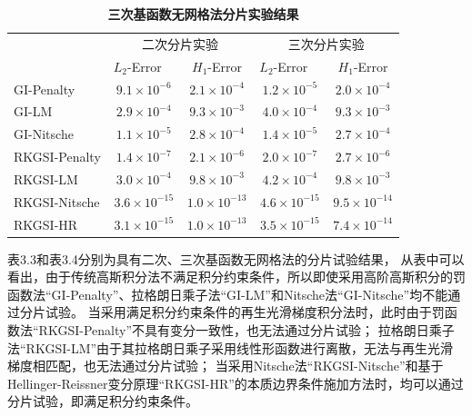 \begin{table}[H]
\caption{\textbf{三次基函数无网格法分片实验结果}}
\centering
\begin{tabular}{lcccc}
   \toprule
& \multicolumn{2}{c}{二次分片实验} & \multicolumn{2}{c}{三次分片实验} \\ \cline{2-5}
   &$L_2$-Error$\quad$&$H_1$-Error&$L_2$-Error$\quad$&$H_1$-Error\\
   \midrule
   GI-Penalty&$9.1\times10^{-6}$&$2.1\times10^{-4}$&$1.2\times10^{-5}$&$2.0\times10^{-4}$\\
   GI-LM&$2.9\times10^{-4}$&$9.3\times10^{-3}$&$4.0\times10^{-4}$&$9.3\times10^{-3}$\\
   GI-Nitsche&$1.1\times10^{-5}$&$2.8\times10^{-4}$&$1.4\times10^{-5}$&$2.7\times10^{-4}$\\
  RKGSI-Penalty&$1.4\times10^{-7}$&$2.1\times10^{-6}$&$2.0\times10^{-7}$&$2.7\times10^{-6}$\\
  RKGSI-LM&$3.0\times10^{-4}$&$9.8\times10^{-3}$&$4.2\times10^{-4}$&$9.8\times10^{-3}$\\
  RKGSI-Nitsche&$3.6\times10^{-15}$&$1.0\times10^{-13}$&$4.6\times10^{-15}$&$9.5\times10^{-14}$\\
  RKGSI-HR&$3.1\times10^{-15}$&$1.0\times10^{-13}$&$3.5\times10^{-15}$&$7.4\times10^{-14}$\\
   \bottomrule
\end{tabular}
\end{table}
表3.3和表3.4分别为具有二次、三次基函数无网格法的分片试验结果，
从表中可以看出，由于传统高斯积分法不满足积分约束条件，所以即使采用高阶高斯积分的罚函数法“GI-Penalty”、拉格朗日乘子法“GI-LM”和Nitsche法“GI-Nitsche”均不能通过分片试验。
当采用满足积分约束条件的再生光滑梯度积分法时，此时由于罚函数法“RKGSI-Penalty”不具有变分一致性，也无法通过分片试验；
拉格朗日乘子法“RKGSI-LM”由于其拉格朗日乘子采用线性形函数进行离散，无法与再生光滑梯度相匹配，也无法通过分片试验；
当采用Nitsche法“RKGSI-Nitsche”和基于Hellinger-Reissner变分原理“RKGSI-HR”的本质边界条件施加方法时，均可以通过分片试验，即满足积分约束条件。
